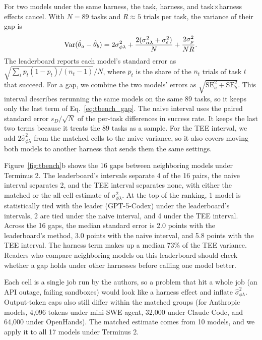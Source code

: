 For two models under the same harness, the task, harness, and task$\times$harness effects cancel. With $N = 89$ tasks and $R \approx 5$ trials per task, the variance of their gap is
\begin{equation}
\label{eq:tbench_gap}
\operatorname{Var}(\hat\theta_a - \hat\theta_b) = 2\sigma^2_{\phi\lambda} + \frac{2(\sigma^2_{\alpha\lambda} + \sigma^2_\epsilon)}{N} + \frac{2\sigma^2_\rho}{NR}.
\end{equation}
The leaderboard reports each model's standard error as $\sqrt{\sum_t p_t(1 - p_t)/(n_t - 1)}/N$, where $p_t$ is the share of the $n_t$ trials of task $t$ that succeed. For a gap, we combine the two models' errors as $\sqrt{\text{SE}_a^2 + \text{SE}_b^2}$. This interval describes rerunning the same models on the same 89 tasks, so it keeps only the last term of Eq.~\ref{eq:tbench_gap}. The naive interval uses the paired standard error $s_D/\sqrt{N}$ of the per-task differences in success rate. It keeps the last two terms because it treats the 89 tasks as a sample. For the TEE interval, we add $2\hat\sigma^2_{\phi\lambda}$ from the matched cells to the naive variance, so it also covers moving both models to another harness that sends them the same settings.

Figure~\ref{fig:tbench}b shows the 16 gaps between neighboring models under Terminus 2. The leaderboard's intervals separate 4 of the 16 pairs, the naive interval separates 2, and the TEE interval separates none, with either the matched or the all-cell estimate of $\sigma^2_{\phi\lambda}$. At the top of the ranking, 1 model is statistically tied with the leader (GPT-5-Codex) under the leaderboard's intervals, 2 are tied under the naive interval, and 4 under the TEE interval. Across the 16 gaps, the median standard error is 2.0 points with the leaderboard's method, 3.0 points with the naive interval, and 5.8 points with the TEE interval. The harness term makes up a median 73\% of the TEE variance. Readers who compare neighboring models on this leaderboard should check whether a gap holds under other harnesses before calling one model better.

Each cell is a single job run by the authors, so a problem that hit a whole job (an API outage, failing sandboxes) would look like a harness effect and inflate $\hat\sigma^2_{\phi\lambda}$. Output-token caps also still differ within the matched groups (for Anthropic models, 4,096 tokens under mini-SWE-agent, 32,000 under Claude Code, and 64,000 under OpenHands). The matched estimate comes from 10 models, and we apply it to all 17 models under Terminus 2.

